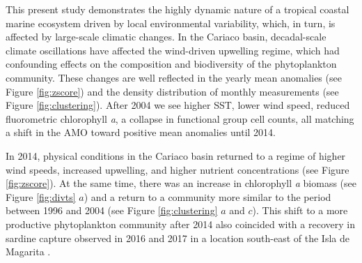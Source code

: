 \documentclass[draft]{agujournal2019}
\begin{document}
This present study demonstrates the highly dynamic nature of a tropical coastal marine ecosystem driven by local environmental variability, which, in turn, is affected by large-scale climatic changes. In the Cariaco basin, decadal-scale climate oscillations have affected the wind-driven upwelling regime, which had confounding effects on the composition and biodiversity of the phytoplankton community.
These changes are well reflected in the yearly mean anomalies (see Figure \ref{fig:zscore}) and the density distribution of monthly measurements (see Figure \ref{fig:clustering}). After 2004 we see higher SST, lower wind speed, reduced fluorometric chlorophyll \textit{a}, a collapse in functional group cell counts, all matching a shift in the AMO toward positive mean anomalies until 2014. 

In 2014, physical conditions in the Cariaco basin returned to a regime of higher wind speeds, increased upwelling, and higher nutrient concentrations (see Figure \ref{fig:zscore}). At the same time, there was an increase in chlorophyll \textit{a} biomass (see Figure \ref{fig:divts} $a$) and a return to a community more similar to the period between 1996 and 2004 (see Figure \ref{fig:clustering} $a$ and $c$). This shift to a more productive phytoplankton community after 2014 also coincided with a recovery in sardine capture observed in 2016 and 2017 in a location south-east of the Isla de Magarita \cite{gomez_gaspar_variacion_2025}.
\end{document}
